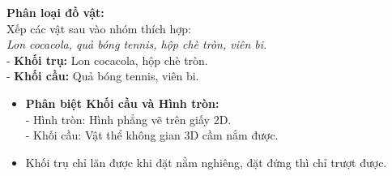 \documentclass[11pt,a4paper]{article}
\begin{document}
\vspace{-1.5mm}
\noindent
\begin{minipage}[t]{0.49\textwidth}\vspace{0pt}
\begin{tcolorbox}[
  enhanced,
  colback=green!4!white,
  colframe=green!60!black,
  arc=2mm, boxrule=0.8pt,
  left=2mm, right=2mm, top=1.8mm, bottom=1.8mm,
  title={\footnotesize\bfseries\color{white}\faCheckCircle\ 4. Ví dụ thực hành chuẩn mực}
]
{\footnotesize
\textbf{Phân loại đồ vật:}\\
Xếp các vật sau vào nhóm thích hợp:\\
\textit{Lon cocacola, quả bóng tennis, hộp chè tròn, viên bi.}\\
- \textbf{Khối trụ:} Lon cocacola, hộp chè tròn.\\
- \textbf{Khối cầu:} Quả bóng tennis, viên bi.
}
\end{tcolorbox}
\end{minipage}
\hfill
\begin{minipage}[t]{0.49\textwidth}\vspace{0pt}
\begin{tcolorbox}[
  enhanced,
  colback=red!4!white,
  colframe=red!75!black,
  arc=2mm, boxrule=0.8pt,
  left=2mm, right=2mm, top=1.8mm, bottom=1.8mm,
  title={\footnotesize\bfseries\color{white}\faExclamationTriangle\ 5. Mẹo tránh bẫy trắc nghiệm}
]
{\footnotesize
\begin{itemize}\setlength{\itemsep}{1pt}\setlength{\leftskip}{-2.5mm}
  \item \textbf{Phân biệt Khối cầu và Hình tròn:}\\
  - Hình tròn: Hình phẳng vẽ trên giấy 2D.\\
  - Khối cầu: Vật thể không gian 3D cầm nắm được.
  \item Khối trụ chỉ lăn được khi đặt nằm nghiêng, đặt đứng thì chỉ trượt được.
\end{itemize}
}
\end{tcolorbox}
\end{minipage}
\end{document}
